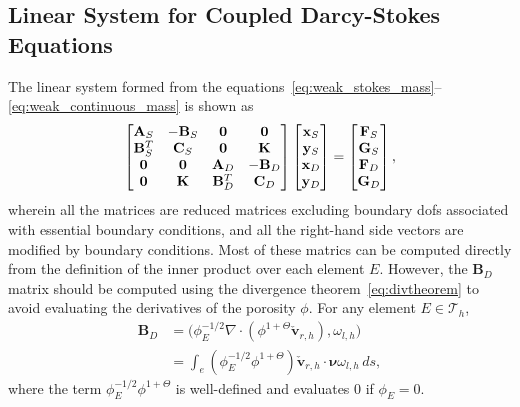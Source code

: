 \subsection{Linear System for Coupled Darcy-Stokes Equations}
The linear system formed from the equations~\eqref{eq:weak_stokes_mass}--\eqref{eq:weak_continuous_mass} is shown as
\begin{equation}
\begin{bmatrix}
\bold{A}_S   & -\bold{B}_S & \bold{0}     &  \bold{0}   \\
\bold{B}_S^T &  \bold{C}_S & \bold{0}     &  \bold{K}   \\
\bold{0}     &  \bold{0}   & \bold{A}_D   & -\bold{B}_D \\
\bold{0}     &  \bold{K}   & \bold{B}_D^T &  \bold{C}_D
\end{bmatrix} \begin{bmatrix}
\bold{x}_S\\
\bold{y}_S\\
\bold{x}_D\\
\bold{y}_D
\end{bmatrix}= 
\begin{bmatrix}
\bold{F}_S\\
\bold{G}_S\\
\bold{F}_D\\
\bold{G}_D
\end{bmatrix},
\end{equation}
wherein all the matrices are reduced matrices excluding boundary dofs associated with 
essential boundary conditions, and all the right-hand side vectors are modified by
boundary conditions.
Most of these matrics can be computed directly from the definition of the inner product over each element $E$. 
However, the $\mathbf{B}_D$ matrix should be computed using the divergence theorem~\eqref{eq:divtheorem} to avoid evaluating
the derivatives of the porosity $\phi$. For any element $E \in \mathcal{T}_h$, 
\begin{equation}
		  \begin{aligned}
		  \mathbf{B}_D &= \big(\phi_E^{-1/2} \nabla \cdot (\phi^{1+\Theta}\check{\mathbf{v}}_{r,h}), \omega_{l,h}\big) \\
					 &= \int_e (\phi_E^{-1/2} \phi^{1+\Theta}) \check{\mathbf{v}}_{r,h}\cdot \pmb{\nu} \omega_{l,h} \, ds,
		  \end{aligned}
\end{equation}
where the term $\phi_E^{-1/2} \phi^{1+\Theta}$ is well-defined and evaluates
$0$ if $\phi_E = 0$.

